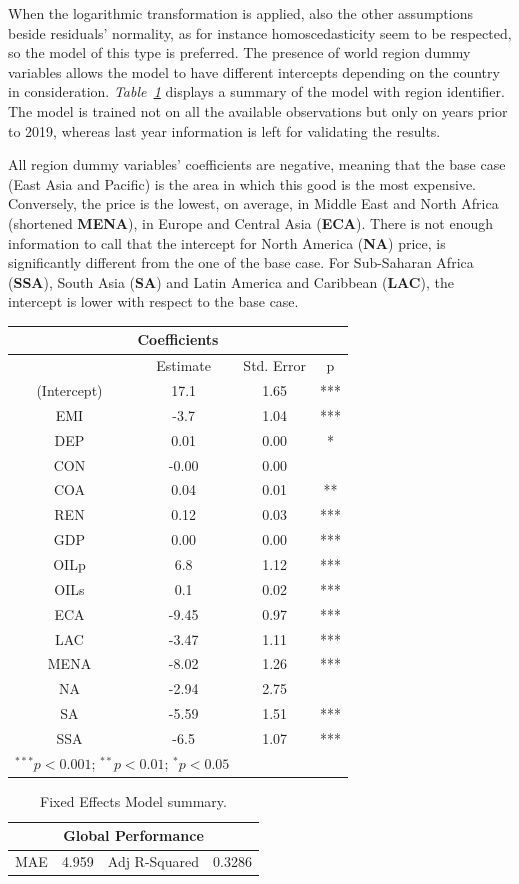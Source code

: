 \documentclass[a4paper,12pt]{book}
\begin{document}
When the logarithmic transformation is applied, also the other assumptions beside residuals' normality, as for instance homoscedasticity seem to be respected, so the model of this type is preferred. The presence of world region dummy variables allows the model to have different intercepts depending on the country in consideration. \textit{Table~\ref{Tab:xx}} displays a summary of the model with region identifier. The model is trained not on all the available observations but only on years prior to 2019, whereas last year information is left for validating the results.

All region dummy variables' coefficients are negative, meaning that the base case (East Asia and Pacific) is the area in which this good is the most expensive. Conversely, the price is the lowest, on average, in Middle East and North Africa (shortened \textbf{MENA}), in Europe and Central Asia (\textbf{ECA}). There is not enough information to call that the intercept for North America (\textbf{NA}) price, is significantly different from the one of the base case. For Sub-Saharan Africa (\textbf{SSA}), South Asia (\textbf{SA}) and Latin America and Caribbean (\textbf{LAC}), the intercept is lower with respect to the base case.

\begin{table}[tb]
\begin{center}
\begin{tabular}{|c|c|c|c|}
\hline
\multicolumn{4}{|c|}{Coefficients}\\
\hline
&Estimate&Std. Error&p\\
\hline
(Intercept)&17.1&1.65&***\\
EMI&-3.7&1.04&***\\
DEP&0.01&0.00&*\\
CON&-0.00&0.00&\\
COA&0.04&0.01&**\\
REN&0.12&0.03&***\\
GDP&0.00&0.00&***\\
OILp&6.8&1.12&***\\
OILs&0.1&0.02&***\\
ECA&-9.45&0.97&***\\
LAC&-3.47&1.11&***\\
MENA&-8.02&1.26&***\\
NA&-2.94&2.75&\\
SA&-5.59&1.51&***\\
SSA&-6.5&1.07&***\\
\hline
\multicolumn{2}{l}{\scriptsize{$^{***}p<0.001$; $^{**}p<0.01$; $^{*}p<0.05$}}
\end{tabular}
\end{center}
\end{table}
\begin{table}[tb]
\begin{center}
\begin{tabular}{|c|c|c|c|}
\hline
\multicolumn{4}{|c|}{Global Performance}\\
\hline
MAE&4.959&Adj R-Squared&0.3286\\
\hline
\end{tabular}
\caption{Fixed Effects Model summary.}
\label{Tab:xx}
\end{center}
\end{table}
\end{document}
